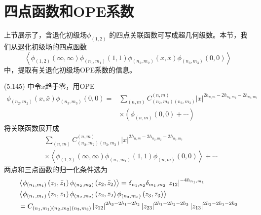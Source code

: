 \section{四点函数和OPE系数}
上节展示了，含退化初级场$ \phi_{(1,2)}$ 的四点关联函数可写成超几何级数。本节，我们从退化初级场的四点函数
\begin{equation}
	\left\langle\phi_{(1,2)}(\infty, \infty) \phi_{\left(n_{1}, m_{1}\right)}(1,1) \phi_{\left(n_{2}, m_{2}\right)}(x, \bar{x}) \phi_{\left(n_{3}, m_{3}\right)}(0,0)\right\rangle 
\end{equation}
中，提取有关退化初级场OPE系数的信息。

(5.145) 中令$ x $趋于零，用OPE
\begin{equation}
\begin{aligned} \phi_{\left(n_{2}, m_{2}\right)}(x, \bar{x}) \phi_{\left(n_{3}, m_{3}\right)}(0,0)=& \sum_{(n, m)} C_{\left(n_{2}, m_{2}\right)\left(n_{3}, m_{3}\right)}^{(n, m)}|x|^{2 h_{n, m}-2 h_{n_{2},m_2}-2 h_{n_{3},m_3}} \\ & \times\left(\phi_{(n, m)}(0,0)+\cdots\right) \end{aligned}
\end{equation} 
将关联函数展开成
\begin{equation}
	\begin{aligned} &\sum_{(n, m)} C_{\left(n_{2}, m_{2}\right)\left(n_{3}, m_{3}\right)}^{(n, m)}|x|^{2 h_{n,m}-2 h_{n_{2}, m_{2}}-2 h_{n_{3}, m_{3}}} \\ &\times\left\langle\phi_{(1,2)}(\infty, \infty) \phi_{\left(n_{1}, m_{1}\right)}(1,1) \phi_{(n, m)}(0,0)\right\rangle+\cdots \end{aligned}
\end{equation} 
两点和三点函数的归一化条件选为
\begin{align} &\left\langle\phi_{(n_1, m_1)}\left(z_{1}, \bar{z}_{1}\right) \phi_{\left(n_2, m_2\right)}\left(z_{2}, \bar{z}_{2}\right)\right\rangle=\delta_{n_{1}, n_{2}} \delta_{m_{1}, m_{2}}\left|z_{12}\right|^{-4 h_{n_{1},m_1}}\\ &\left\langle\phi_{\left(n_{1}, m_{1}\right)}\left(z_{1}, \bar{z}_{1}\right) \phi_{\left(n_{2}, m_{2}\right)}\left(z_{2}, \bar{z}_{2}\right) \phi_{\left(n_{3}, m_{3}\right)}\left(z_{3}, \bar{z}_{3}\right)\right\rangle \notag\\ &=C_{\left(n_{1}, m_{1}\right)\left(n_{2}, m_{2}\right)\left(n_{3}, m_{3}\right)}\left|z_{12}\right|^{2 h_{3}-2 h_{1}-2 h_{2}}\left|z_{23}\right|^{2 h_{1}-2 h_{2}-2 h_{3}}\left|z_{13}\right|^{2 h_{2}-2 h_{1}-2 h_{3}} 
\end{align}
